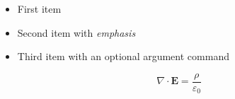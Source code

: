 \begin{itemize}
  \item First item
  \item Second item with \textit{emphasis}
  \item Third item with an optional argument command 
\end{itemize}

\begin{equation}
  \nabla \cdot \mathbf{E} = \frac{\rho}{\varepsilon_0}
\end{equation}
